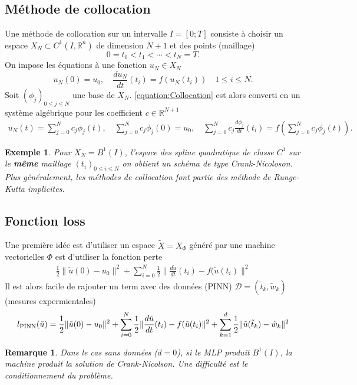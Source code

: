 \documentclass[11pt,a4paper]{article}
\newcommand{\R}{\mathbb R}
\newcommand{\norm}[1]{\|#1\|}
\newtheorem{remark}[theorem]{Remarque}
\newtheorem{example}[theorem]{Exemple}
\begin{document}
\subsection{Méthode de collocation}\label{subsec:}
%
Une méthode de collocation sur un intervalle $I=[0;T]$ consiste à choisir un espace $X_N\subset C^1(I,\R^n)$ de dimension $N+1$ et des points (maillage)
%
\begin{equation}\label{equation:Mesh}
0 = t_0 < t_1 < \cdots < t_N = T.
\end{equation}
%
On impose les équations à une fonction $u_N\in X_N$
%
\begin{equation}\label{equation:Collocation}
u_N(0) = u_0,\quad \frac{du_N}{dt}(t_i) = f(u_N(t_i))\quad 1\le i\le N.
\end{equation}
%
Soit $(\phi_j)_{0\le j\le N}$ une base de $X_N$. \eqref{equation:Collocation} est alors converti en un système algébrique pour les coefficient $c\in\R^{N+1}$
\begin{align*}
u_N(t) = \sum_{j=0}^N c_j \phi_j(t),\quad \sum_{j=0}^N c_j \phi_j(0) = u_0,\quad \sum_{j=0}^N c_j\frac{d\phi_j}{dt}(t_i) = f(\sum_{j=0}^N c_j \phi_j(t)).
\end{align*}
%
%
\begin{example}\label{example:}
Pour $X_N = B^1(I)$, l'espace des spline quadratique de classe $C^1$ sur le \textbf{même} maillage $(t_i)_{0\le i\le N}$ on obtient un schéma de type Crank-Nicoloson. Plus généralement, les méthodes de collocation font partie des méthode de Runge-Kutta implicites.
\end{example}
%
%
\subsection{Fonction loss}\label{subsec:}
%
Une première idée est d'utiliser un espace $\tilde X=X_{\Phi}$ généré par une machine vectorielles $\Phi$ est d'utiliser la fonction perte
\begin{align*}
\frac12\norm{\tilde u(0)-u_0}^2 + \sum_{i=0}^N \frac12\norm{\frac{d\tilde u}{dt}(t_i) - f(\tilde u(t_i)}^2
\end{align*}
Il est alors facile de rajouter un term avec des données (PINN) $\mathcal D=(\tilde t_k, \tilde w_k)$ (mesures expermientales)
\begin{align*}
l_{\rm PINN}(\tilde u) = \frac12\norm{\tilde u(0)-u_0}^2 + \sum_{i=0}^N \frac12\norm{\frac{d\tilde u}{dt}(t_i) - f(\tilde u(t_i)}^2 + \sum_{k=1}^d \frac12\norm{\tilde u(\tilde t_k) - \tilde w_k}^2
\end{align*}
%
%
\begin{remark}\label{remark:}
Dans le cas sans données ($d=0$), si le MLP produit $B^1(I)$, la machine produit la solution de Crank-Nicolson. Une difficulté est 
le conditionnement du problème.
\end{remark}
%
%
\end{document}
